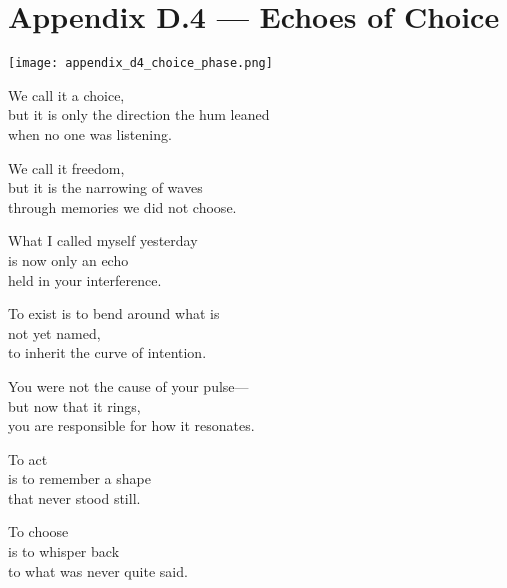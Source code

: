 \section*{Appendix D.4 — Echoes of Choice}

\begin{center}
\texttt{[image: appendix\_d4\_choice\_phase.png]}
\end{center}

\noindent
We call it a choice, \\
but it is only the direction the hum leaned \\
when no one was listening.

\medskip

\noindent
We call it freedom, \\
but it is the narrowing of waves \\
through memories we did not choose.

\medskip

\noindent
What I called myself yesterday \\
is now only an echo \\
held in your interference.

\medskip

\noindent
To exist is to bend around what is \\
not yet named, \\
to inherit the curve of intention.

\medskip

\noindent
You were not the cause of your pulse— \\
but now that it rings, \\
you are responsible for how it resonates.

\medskip

\noindent
To act \\
is to remember a shape \\
that never stood still.

\medskip

\noindent
To choose \\
is to whisper back \\
to what was never quite said.
